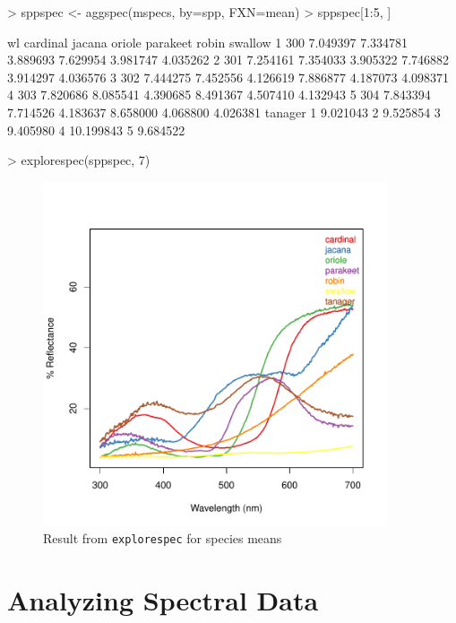 \documentclass{article}
\newcommand{\code}[1]{{\tt #1}}  %
\begin{document}
\begin{Schunk}
\begin{Sinput}
> sppspec <- aggspec(mspecs, by=spp, FXN=mean)
> sppspec[1:5, ]
\end{Sinput}
\begin{Soutput}
   wl cardinal   jacana   oriole parakeet    robin  swallow
1 300 7.049397 7.334781 3.889693 7.629954 3.981747 4.035262
2 301 7.254161 7.354033 3.905322 7.746882 3.914297 4.036576
3 302 7.444275 7.452556 4.126619 7.886877 4.187073 4.098371
4 303 7.820686 8.085541 4.390685 8.491367 4.507410 4.132943
5 304 7.843394 7.714526 4.183637 8.658000 4.068800 4.026381
    tanager
1  9.021043
2  9.525854
3  9.405980
4 10.199843
5  9.684522
\end{Soutput}
\begin{Sinput}
> explorespec(sppspec, 7)
\end{Sinput}
\end{Schunk}

\begin{figure}[h] %
\begin{center}
\includegraphics[width=4in]{pavo-exploresppmeans}
\end{center}
\caption{Result from \code{explorespec} for species means}
\label{fig2}
\end{figure}

\section{Analyzing Spectral Data}
\end{document}

